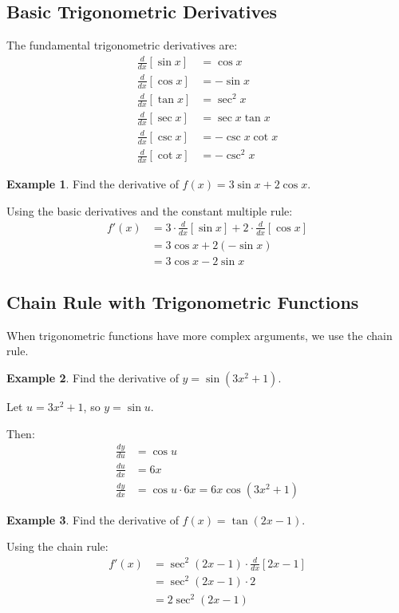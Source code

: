 \documentclass[12pt,a4paper]{book}
\theoremstyle{definition}
\newtheorem{example}{Example}[chapter]
\begin{document}
\subsection{Basic Trigonometric Derivatives}

\begin{keyformula}
The fundamental trigonometric derivatives are:
\begin{align}
\frac{d}{dx}[\sin x] &= \cos x\\
\frac{d}{dx}[\cos x] &= -\sin x\\
\frac{d}{dx}[\tan x] &= \sec^2 x\\
\frac{d}{dx}[\sec x] &= \sec x \tan x\\
\frac{d}{dx}[\csc x] &= -\csc x \cot x\\
\frac{d}{dx}[\cot x] &= -\csc^2 x
\end{align}
\end{keyformula}

\begin{example}
Find the derivative of $f(x) = 3\sin x + 2\cos x$.

Using the basic derivatives and the constant multiple rule:
\begin{align}
f'(x) &= 3 \cdot \frac{d}{dx}[\sin x] + 2 \cdot \frac{d}{dx}[\cos x]\\
&= 3\cos x + 2(-\sin x)\\
&= 3\cos x - 2\sin x
\end{align}
\end{example}

\subsection{Chain Rule with Trigonometric Functions}

When trigonometric functions have more complex arguments, we use the chain rule.

\begin{example}
Find the derivative of $y = \sin(3x^2 + 1)$.

Let $u = 3x^2 + 1$, so $y = \sin u$.

Then:
\begin{align}
\frac{dy}{du} &= \cos u\\
\frac{du}{dx} &= 6x\\
\frac{dy}{dx} &= \cos u \cdot 6x = 6x\cos(3x^2 + 1)
\end{align}
\end{example}

\begin{example}
Find the derivative of $f(x) = \tan(2x - 1)$.

Using the chain rule:
\begin{align}
f'(x) &= \sec^2(2x - 1) \cdot \frac{d}{dx}[2x - 1]\\
&= \sec^2(2x - 1) \cdot 2\\
&= 2\sec^2(2x - 1)
\end{align}
\end{example}
\end{document}
